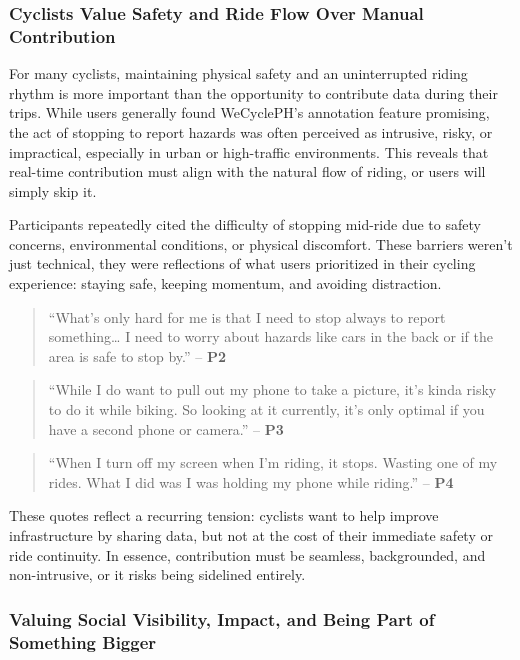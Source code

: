 \subsubsection{Cyclists Value Safety and Ride Flow Over Manual Contribution}

For many cyclists, maintaining physical safety and an uninterrupted riding rhythm is more important than the opportunity to contribute data during their trips. While users generally found WeCyclePH's annotation feature promising, the act of stopping to report hazards was often perceived as intrusive, risky, or impractical, especially in urban or high-traffic environments. This reveals that real-time contribution must align with the natural flow of riding, or users will simply skip it.

Participants repeatedly cited the difficulty of stopping mid-ride due to safety concerns, environmental conditions, or physical discomfort. These barriers weren't just technical, they were reflections of what users prioritized in their cycling experience: staying safe, keeping momentum, and avoiding distraction.

\begin{quote}
``What's only hard for me is that I need to stop always to report something… I need to worry about hazards like cars in the back or if the area is safe to stop by.'' – \textbf{P2}
\end{quote}

\begin{quote}
``While I do want to pull out my phone to take a picture, it's kinda risky to do it while biking. So looking at it currently, it's only optimal if you have a second phone or camera.'' – \textbf{P3}
\end{quote}

\begin{quote}
``When I turn off my screen when I'm riding, it stops. Wasting one of my rides. What I did was I was holding my phone while riding.'' – \textbf{P4}
\end{quote}

These quotes reflect a recurring tension: cyclists want to help improve infrastructure by sharing data, but not at the cost of their immediate safety or ride continuity. In essence, contribution must be seamless, backgrounded, and non-intrusive, or it risks being sidelined entirely.

\subsubsection{Valuing Social Visibility, Impact, and Being Part of Something Bigger}

